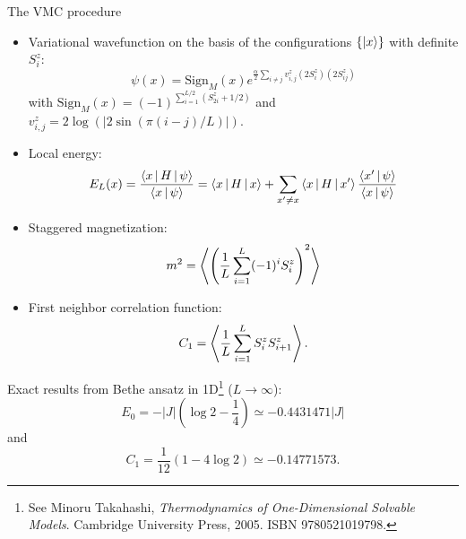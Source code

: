 \documentclass[10pt, compress, protectframetitle, handout]{beamer}
\begin{document}
\begin{frame}[allowframebreaks]{The VMC procedure}

	\begin{itemize}
		\item Variational wavefunction on the basis of the configurations $\{\Ket{x}\}$ with definite $S_{i}^{z}$:
		\begin{equation}
			\psi(x) = \text{Sign}_{M}(x)e^{\frac{\alpha}{2}\sum_{i \neq j}v_{i,j}^{z}(2S_{i}^{z})(2S_{ij}^{z})}
		\end{equation}
		with $\text{Sign}_{M}(x) = (-1)^{\sum_{i=1}^{L/2}(S_{2i}^{z}+1/2)}$ and $v_{i,j}^{z} = 2\log(|2\sin(\pi(i-j)/L)|)$.
		\item Local energy:
		\begin{equation}
			E_L(x) = \frac{\Braket{x|H|\psi}}{\Braket{x|\psi}} 
			= \Braket{x|H|x} 
			+ \sum_{x' \neq x} \Braket{x|H|x'}\frac{\Braket{x'|\psi}}{\Braket{x|\psi}} 
		\end{equation}
		\item Staggered magnetization:
		\begin{equation}
			m^2 = \Braket{ \left( \frac{1}{L}\sum_{i=1}^{L}(-1)^iS_{i}^{z} \right)^2 }
		\end{equation}
		\item First neighbor correlation function:
		\begin{equation}
			C_1 = \Braket{\frac{1}{L}\sum_{i=1}^{L}S_{i}^{z}S_{i+1}^{z}}.
		\end{equation}
	\end{itemize}
	
	Exact results from Bethe ansatz in 1D\footnote{See Minoru Takahashi, \emph{Thermodynamics of One-Dimensional Solvable Models}. Cambridge University Press, 2005. ISBN 9780521019798.} ($L \to \infty$):
	\begin{equation*}
		E_{0} = -|J|\left(\log2-\frac{1}{4}\right) \simeq -0.4431471|J|
	\end{equation*}
	and
	\begin{equation*}
		C_1 = \frac{1}{12}\left(1-4\log2\right) \simeq -0.14771573.
	\end{equation*}
	
\end{frame}

%
%	
\end{document}
